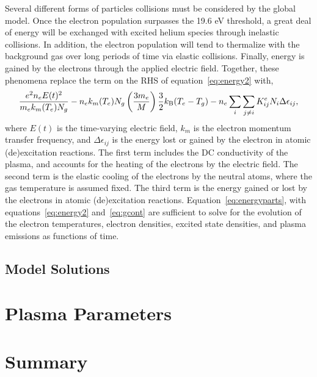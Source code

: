 Several different forms of particles collisions must be considered by the global
model. Once the electron population surpasses the 19.6 eV threshold, a great
deal of energy will be exchanged with excited helium species through inelastic
collisions. In addition, the electron population will tend to thermalize with
the background gas over long periods of time via elastic collisions. Finally,
energy is gained by the electrons through the applied electric field. Together,
these phenomena replace the term on the RHS of equation~\ref{eq:energy2} with,
\begin{equation}
  \frac{e^2n_eE(t)^2}{m_ek_m(T_e)N_g}
  - n_ek_m(T_e)N_g\left(\frac{3m_e}{M}\right)\frac{3}{2}k_\mathrm{B}(T_e-T_g)
  - n_e \sum_i \sum_{j\neq i} K^e_{ij}N_i\Delta\epsilon_{ij},
  \label{eq:energyparts}
\end{equation}
where $E(t)$ is the time-varying electric field, $k_m$ is the electron momentum
transfer frequency, and $\Delta\epsilon_{ij}$ is the energy lost or gained by
the electron in atomic (de)excitation reactions. The first term includes the DC
conductivity \cite{Lieberman2005} of the plasma, and accounts for the heating of
the electrons by the electric field. The second term is the elastic cooling of
the electrons by the neutral atoms, where the gas temperature is assumed fixed.
The third term is the energy gained or lost by the electrons in atomic
(de)excitation reactions. Equation~\ref{eq:energyparts}, with
equations~\ref{eq:energy2} and~\ref{eq:gcont} are sufficient to solve for the
evolution of the electron temperatures, electron densities, excited state
densities, and plasma emissions as functions of time.

\subsection{Model Solutions}


\section{Plasma Parameters}



\section{Summary}



